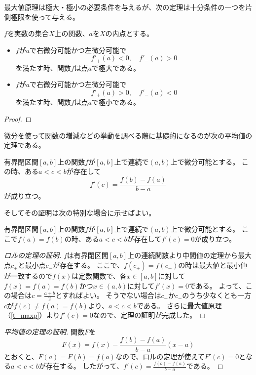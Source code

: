 最大値原理は極大・極小の必要条件を与えるが、次の定理は十分条件の一つを片側極限を使って与える。

\begin{theorem}
$f$を実数の集合$X$上の関数、$a$を$X$の内点とする。
\begin{itemize}
\item
$f$が$a$で右微分可能かつ左微分可能で
$$
f'_+(a) < 0,
\quad f'_-(a) > 0
$$
を満たす時、関数$f$は点$a$で極大である。
\item
$f$が$a$で右微分可能かつ左微分可能で
$$
f'_+(a) > 0,
\quad f'_-(a) < 0
$$
を満たす時、関数$f$は点$a$で極小である。
\end{itemize}
\end{theorem}

\begin{proof}
\end{proof}

微分を使って関数の増減などの挙動を調べる際に基礎的になるのが次の平均値の定理である。

\begin{theorem}[平均値の定理]
有界閉区間$[a, b]$上の関数$f$が$[a, b]$上で連続で$(a, b)$上で微分可能とする。
この時、ある$a < c < b$が存在して
$$
f'(c) = \frac{f(b)-f(a)}{b-a}
$$
が成り立つ。
\end{theorem}

そしてその証明は次の特別な場合に示せばよい。

\begin{theorem}[ロルの定理]
有界閉区間$[a, b]$上の関数$f$が$[a, b]$上で連続で$(a, b)$上で微分可能とする。
ここで$f(a) = f(b)$の時、ある$a < c < b$が存在して$f'(c) = 0$が成り立つ。
\end{theorem}

\begin{proof}[ロルの定理の証明]
$f$は有界閉区間$[a, b]$上の連続関数より中間値の定理から最大点$c_+$と最小点$c_-$が存在する。
ここで、$f(c_+) = f(c_-)$の時は最大値と最小値が一致するので$f(x)$は定数関数で、各$x \in [a, b]$に対して$f(x) = f(a) = f(b)$かつ$x \in (a, b)$に対して$f'(x) = 0$である。
よって、この場合は$c = \frac{a+b}{2}$とすればよい。
そうでない場合は$c_+$か$c_-$のうち少なくとも一方$c$が$f(c) \ne f(a) = f(b)$より、$a < c < b$である。
さらに最大値原理（\ref{t_maxp}）より$f'(c) = 0$なので、定理の証明が完成した。
\end{proof}

\begin{proof}[平均値の定理の証明]
関数$F$を
$$
F(x) = f(x)-\frac{f(b)-f(a)}{b-a}(x-a)
$$
とおくと、$F(a) = F(b) = f(a)$なので、ロルの定理が使えて$F'(c) = 0$となる$a < c < b$が存在する。
したがって、$f'(c) = \frac{f(b)-f(a)}{b-a}$である。
\end{proof}

